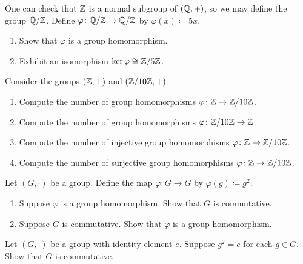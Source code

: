 \documentclass[../main.tex]{subfiles}
\begin{document}
\begin{homework}
    One can check that $\mathbb Z$ is a normal subgroup of $(\mathbb Q,+)$, so we may define the group $\mathbb Q/\mathbb Z$. Define $\varphi\colon\mathbb Q/\mathbb Z\to\mathbb Q/\mathbb Z$ by $\varphi(x)\coloneqq 5x$.
    \begin{enumerate}[label=(\alph*)]
        \item Show that $\varphi$ is a group homomorphism.
        \item Exhibit an isomorphism $\ker\varphi\cong\mathbb Z/5\mathbb Z$.
    \end{enumerate}
\end{homework}

\begin{homework}
    Consider the groups $(\mathbb Z,+)$ and $(\mathbb Z/10\mathbb Z,+)$.
    \begin{enumerate}[label=(\alph*)]
        \item Compute the number of group homomorphisms $\varphi\colon\mathbb Z\to\mathbb Z/10\mathbb Z$.
        \item Compute the number of group homomorphisms $\varphi\colon\mathbb Z/10\mathbb Z\to\mathbb Z$.
        \item Compute the number of injective group homomorphisms $\varphi\colon\mathbb Z\to\mathbb Z/10\mathbb Z$.
        \item Compute the number of surjective group homomorphisms $\varphi\colon\mathbb Z\to\mathbb Z/10\mathbb Z$.
    \end{enumerate}
\end{homework}

\begin{homework}
    Let $(G,\cdot)$ be a group. Define the map $\varphi\colon G\to G$ by $\varphi(g)\coloneqq g^2$.
    \begin{enumerate}[label=(\alph*)]
        \item Suppose $\varphi$ is a group homomorphism. Show that $G$ is commutative.
        \item Suppose $G$ is commutative. Show that $\varphi$ is a group homomorphism.
    \end{enumerate}
\end{homework}

\begin{homework}
    Let $(G,\cdot)$ be a group with identity element $e$. Suppose $g^2=e$ for each $g\in G$. Show that $G$ is commutative.
\end{homework}
\end{document}
